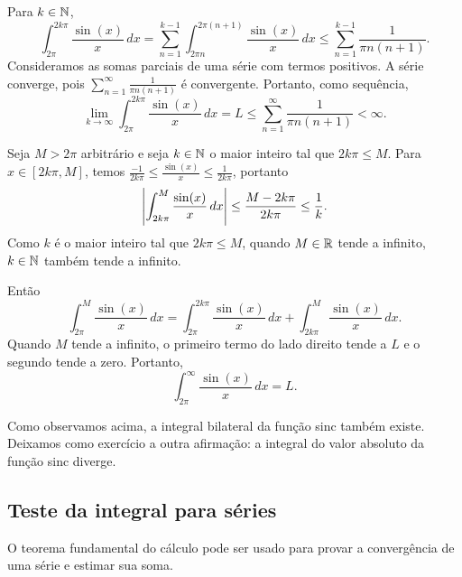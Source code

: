 \begin{example}
Para $k \in {\mathbb{N}}$,
\begin{equation*}
\int_{2\pi}^{2k\pi} \frac{\sin(x)}{x} \,dx
=
\sum_{n=1}^{k-1}
\int_{2\pi n}^{2\pi (n+1)} \frac{\sin(x)}{x} \,dx 
\leq
\sum_{n=1}^{k-1}
\frac{1}{\pi n(n+1)} .
\end{equation*}
Consideramos as somas parciais de uma série com termos positivos.
A série converge, pois
$\sum_{n=1}^\infty \frac{1}{\pi n (n+1)}$ é convergente. Portanto, como sequência,
\begin{equation*}
\lim_{k\to \infty} \int_{2\pi}^{2k\pi} \frac{\sin(x)}{x} \,dx
=L \leq
\sum_{n=1}^{\infty}
\frac{1}{\pi n(n+1)} < \infty .
\end{equation*}

Seja $M > 2\pi$ arbitrário e seja $k \in {\mathbb{N}}$
o maior inteiro tal que $2k\pi \leq M$.
Para $x \in [2k\pi,M]$, temos
$\frac{-1}{2k\pi} \leq \frac{\sin(x)}{x} \leq \frac{1}{2k\pi}$, portanto
\begin{equation*}
\left\lvert {\int_{2k\pi}^{M} \frac{\sin(x)}{x} \,dx } \right\rvert  \leq
\frac{M-2k\pi}{2k\pi} \leq \frac{1}{k} .
\end{equation*}
Como $k$ é o maior inteiro tal que $2k\pi \leq M$,
quando $M\in {\mathbb{R}}$ tende a infinito, $k \in {\mathbb{N}}$ também tende a infinito.

Então
\begin{equation*}
\int_{2\pi}^M \frac{\sin(x)}{x}\,dx
=
\int_{2\pi}^{2k\pi} \frac{\sin(x)}{x} \,dx
+
\int_{2k\pi}^{M} \frac{\sin(x)}{x} \,dx .
\end{equation*}
Quando $M$ tende a infinito, o primeiro termo do lado direito tende a $L$
e o segundo tende a zero. Portanto,
\begin{equation*}
\int_{2\pi}^\infty \frac{\sin(x)}{x} \,dx = L .
\end{equation*}

Como observamos acima, a integral bilateral da função sinc também existe.
Deixamos como exercício a outra afirmação: a integral
do valor absoluto da função sinc diverge.
\end{example}

\subsection{Teste da integral para séries}

O teorema fundamental do cálculo pode ser usado para provar a convergência
de uma série e estimar sua soma.

